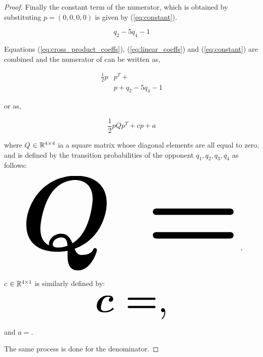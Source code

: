 \begin{proof}
Finally the constant term of the numerator, which is obtained by substituting
$p=(0, 0, 0, 0)$ is given by (\ref{eq:constant}).

\begin{equation}\label{eq:constant}
q_{2} - 5 q_{4} - 1
\end{equation}

Equations (\ref{eq:cross_product_coeffs}), (\ref{eq:linear_coeffs}) and (\ref{eq:constant})
are combined and the numerator of can be written as,

\begingroup
\tiny\boldmath
\begin{align*}
    \frac{1}{2}p &  p^T +  \\
    &  p + q_{2} - 5 q_{4} - 1
\end{align*}
\endgroup

or as,

\[\frac{1}{2}pQp^T + cp + a\]

where \(Q\) \(\in \mathbb{R}^{4\times4}\) ia a square matrix whose
diagonal elements are all equal to zero, and is defined by the
transition probabilities of the opponent \(q_1, q_2, q_3, q_4\) as follows:

\begin{equation*}
    \resizebox{0.9\linewidth}{!}{\arraycolsep=2.5pt%
    \boldmath\(
    Q = \)},
\end{equation*}

\(c\) \(\in \mathbb{R}^{4 \times 1}\) is similarly defined by:

\begin{equation*}
    \resizebox{0.3\linewidth}{!}{\arraycolsep=2.5pt%
    \boldmath\(c = \),}
\end{equation*}

and \(a = \).

The same process is done for the denominator.
\end{proof}